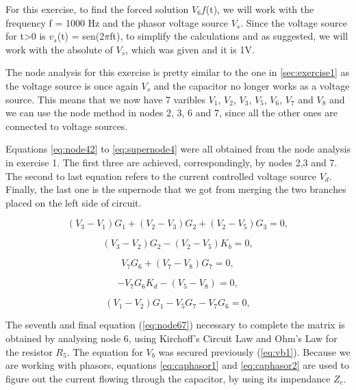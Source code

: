 For this exercise, to find the forced solution $V_6f$(t), we will work with the frequency f = 1000 Hz and the phasor voltage source $V_s$. Since the voltage source for t>0 is $v_s$(t) = sen(2$\pi$ft), to simplify the calculations and as suggested, we will work with the absolute of $V_s$, which was given and it is 1V. 

The node analysis for this exercise is pretty similar to the one in \ref{sec:exercise1} as the voltage source is once again $V_s$ and the capacitor no longer works as a voltage source. This means that we now have 7 varibles $V_1$, $V_2$, $V_3$, $V_5$, $V_6$, $V_7$ and $V_8$ and we can use the node method in nodes 2, 3, 6 and 7, since all the other ones are connected to voltage sources.

Equations \ref{eq:node42} to \ref{eq:supernode4} were all obtained from the node analysis in exercise 1. The first three are achieved, correspondingly, by nodes 2,3 and 7. The second to last equation refers to the current controlled voltage source $V_d$. Finally, the last one is the supernode that we got from merging the two branches placed on the left side of circuit.

\begin{equation}
  (V_{3} - V_{1})G_{1} + (V_{2} - V_{3})G_{2} + (V_{2} - V_{5})G_{3}= 0,
  \label{eq:node42}
\end{equation}

\begin{equation}
  (V_{3} - V_{2})G_{2} - (V_{2} - V_{5})K_{b} = 0,
  \label{eq:node43}
\end{equation}


\begin{equation}
  V_{7}G_{6} + (V_{7} - V_{8})G_{7} = 0,
  \label{eq:node47}
\end{equation}


\begin{equation}
  -V_{7}G_{6}K_{d} - (V_{5} - V_{8}) = 0,
  \label{eq:vd4}
\end{equation}

\begin{equation}
  (V_{1} - V_{2})G_{1} - V_{5}G_{7} - V_{7}G_{6} = 0,
  \label{eq:supernode4}
\end{equation}

The seventh and final equation (\ref{eq:node67}) necessary to complete the matrix is obtained by analysing node 6, using Kirchoff's Circuit Law and Ohm's Law for the resistor $R_5$. The equation for $V_b$ was secured previously (\ref{eq:vb1}). Because we are working with phasors, equations \ref{eq:caphasor1} and \ref{eq:caphasor2} are used to figure out the current flowing through the capacitor, by using its impendance $Z_c$.

